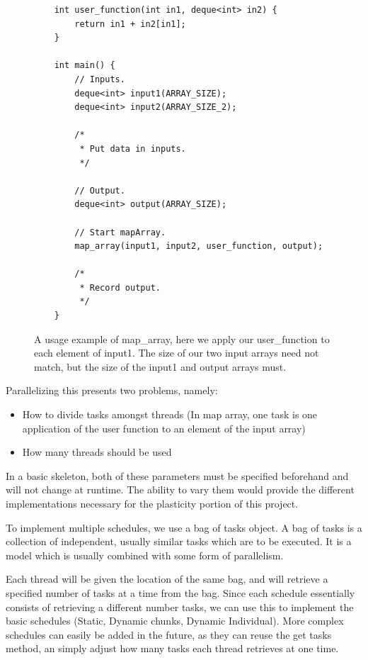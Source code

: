 \begin{figure}
	\begin{lstlisting}
	int user_function(int in1, deque<int> in2) {
		return in1 + in2[in1];
	}

	int main() {
		// Inputs.
		deque<int> input1(ARRAY_SIZE);
		deque<int> input2(ARRAY_SIZE_2);

		/*
		 * Put data in inputs.
		 */

		// Output.
		deque<int> output(ARRAY_SIZE);

		// Start mapArray.
		map_array(input1, input2, user_function, output);

		/*
		 * Record output.
		 */
	}
	\end{lstlisting}

	\caption{A usage example of map\_array, here we apply our user\_function to each element of input1. The size of our two input arrays need not match, but the size of the input1 and output arrays must.}
	\label{fig:map_array_usage_example}
\end{figure}



\begin{minipage}{\textwidth}

Parallelizing this presents two problems, namely:

\begin{itemize}
	\item How to divide tasks amongst threads (In map array, one task is one application of the user function to an element of the input array)
	\item How many threads should be used
\end{itemize}

\end{minipage}
 
In a basic skeleton, both of these parameters must be specified beforehand and will not change at runtime. The ability to vary them would provide the different implementations necessary for the plasticity portion of this project.

To implement multiple schedules, we use a bag of tasks object. A bag of tasks is a collection of independent, usually similar tasks which are to be executed. It is a model which is usually combined with some form of parallelism.

Each thread will be given the location of the same bag, and will retrieve a specified number of tasks at a time from the bag. Since each schedule essentially consists of retrieving a different number tasks, we can use this to implement the basic schedules (Static, Dynamic chunks, Dynamic Individual). More complex schedules can easily be added in the future, as they can reuse the get tasks method, an simply adjust how many tasks each thread retrieves at one time.

